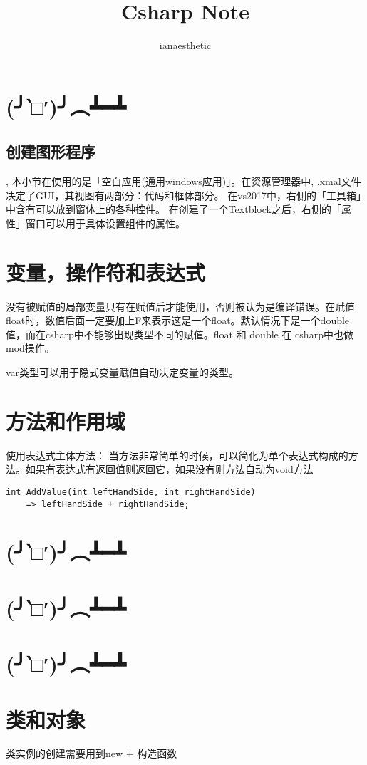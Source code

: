 \documentclass[10pt, a4paper]{article}
\title{Csharp Note}
\author{ianaesthetic}
\begin{document}
\maketitle
\newpage

    \section{(╯‵□′)╯︵┻━┻}
        \subsection{创建图形程序},
            本小节在使用的是「空白应用(通用windows应用)」。在资源管理器中, .xmal文件决定了GUI，其视图有两部分：代码和框体部分。 在vs2017中，右侧的「工具箱」中含有可以放到窗体上的各种控件。 在创建了一个Textblock之后，右侧的「属性」窗口可以用于具体设置组件的属性。
    
    \section{变量，操作符和表达式}
        没有被赋值的局部变量只有在赋值后才能使用，否则被认为是编译错误。在赋值float时，数值后面一定要加上F来表示这是一个float。默认情况下是一个double值，而在csharp中不能够出现类型不同的赋值。float 和 double 在 csharp中也做 mod操作。

        var类型可以用于隐式变量赋值自动决定变量的类型。
    \section{方法和作用域}
        使用表达式主体方法： 当方法非常简单的时候，可以简化为单个表达式构成的方法。如果有表达式有返回值则返回它，如果没有则方法自动为void方法
\begin{lstlisting}
int AddValue(int leftHandSide, int rightHandSide) 
    => leftHandSide + rightHandSide;
\end{lstlisting}

    \section{(╯‵□′)╯︵┻━┻}
    \section{(╯‵□′)╯︵┻━┻}
    \section{(╯‵□′)╯︵┻━┻}
    \section{类和对象}
        类实例的创建需要用到new + 构造函数
\end{document}
